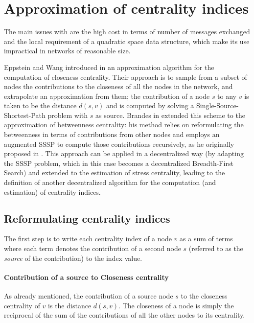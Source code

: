 
\section{Approximation of centrality indices}
\label{sec:mbfs}

The main issues with \deccen{} are the high cost in terms of number of messages exchanged and the local requirement of a quadratic space data structure, which make its use impractical in networks of reasonable size.

Eppstein and Wang introduced in \cite{ew2004} an approximation algorithm for the computation of closeness centrality. Their approach is to sample from a subset of nodes the contributions to the closeness of all the nodes in the network, and extrapolate an approximation from them; the contribution of a node $s$ to any $v$ is taken to be the distance $d(s,v)$ and is computed by solving a Single-Source-Shortest-Path problem with $s$ as source. Brandes in \cite{brandes2007} extended this scheme to the approximation of betweenness centrality: his method relies on reformulating the betweenness in terms of contributions from other nodes and employs an augmented SSSP to compute those contributions recursively, as he originally proposed in \cite{brandes2001}. This approach can be applied in a decentralized way (by adapting the SSSP problem, which in this case becomes a decentralized Breadth-First Search) and extended to the estimation of stress centrality, leading to the definition of another decentralized algorithm for the computation (and estimation) of centrality indices.

\subsection{Reformulating centrality indices}

The first step is to write each centrality index of a node $v$ as a sum of terms where each term denotes the contribution of a second node $s$ (referred to as the \emph{source} of the contribution) to the index value.

\paragraph{Contribution of a source to Closeness centrality}
As already mentioned, the contribution of a source node $s$ to the closeness centrality of $v$ is the distance $d(s,v)$. The closeness of a node is simply the reciprocal of the sum of the contributions of all the other nodes to its centrality.

